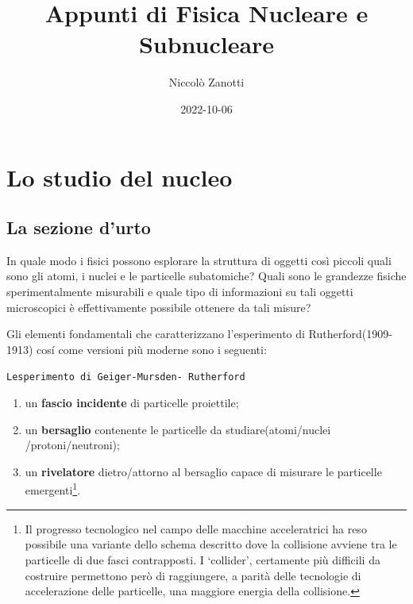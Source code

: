 \documentclass[]{tufte-book}
\title[Appunti di Fisica Nucleare e Subnucleare]{Appunti di Fisica
Nucleare e Subnucleare}
\author{Niccolò Zanotti}
\date{2022-10-06}
\providecommand{\tightlist}{%
  \setlength{\itemsep}{0pt}\setlength{\parskip}{0pt}}
\theoremstyle{definition}
\theoremstyle{theorem}
\theoremstyle{plain}
\theoremstyle{remark}
\theoremstyle{remark}
\begin{document}
\maketitle



{
\setcounter{tocdepth}{1}
\tableofcontents
}

\hypertarget{lo-studio-del-nucleo}{%
\chapter{Lo studio del nucleo}\label{lo-studio-del-nucleo}}

\hypertarget{la-sezione-durto}{%
\section{La sezione d'urto}\label{la-sezione-durto}}

In quale modo i fisici possono esplorare la struttura di oggetti così
piccoli quali sono gli atomi, i nuclei e le particelle subatomiche?
Quali sono le grandezze fisiche sperimentalmente misurabili e quale tipo
di informazioni su tali oggetti microscopici è effettivamente possibile
ottenere da tali misure?

Gli elementi fondamentali che caratterizzano l'esperimento di
Rutherford(1909-1913) cosí come versioni più moderne sono i seguenti:

\begin{marginfigure}
\texttt{L\textquotesingle{}esperimento\ di\ Geiger-Mursden-\ Rutherford}
\end{marginfigure}

\begin{enumerate}
\def\labelenumi{\arabic{enumi}.}
\tightlist
\item
  un \textbf{fascio incidente} di particelle proiettile;
\item
  un \textbf{bersaglio} contenente le particelle da
  studiare(atomi/nuclei /protoni/neutroni);
\item
  un \textbf{rivelatore} dietro/attorno al bersaglio capace di misurare
  le particelle emergenti\footnote{Il progresso tecnologico nel campo
    delle macchine acceleratrici ha reso possibile una variante dello
    schema descritto dove la collisione avviene tra le particelle di due
    fasci contrapposti. I `collider', certamente più difficili da
    costruire permettono però di raggiungere, a parità delle tecnologie
    di accelerazione delle particelle, una maggiore energia della
    collisione.}.
\end{enumerate}
\end{document}
